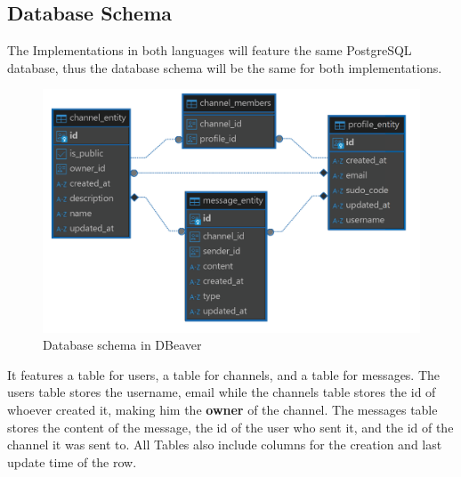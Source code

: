 \documentclass[a4paper,12pt]{article}
\begin{document}
	\newpage
	\subsection{Database Schema}
	\label{subsec:database_schema}
	The Implementations in both languages will feature the same PostgreSQL database, thus the database schema will 
	be the same for both implementations.
	\begin{figure}[h]
		\centering
		\includegraphics[width=\textwidth]{dbeaver_database_representation.png}
		\caption{Database schema in DBeaver}
		\label{fig:dbeaver_database_representation}
	\end{figure}

	It features a table for users, a table for channels, and a table for messages. The users table stores the username, email
	while the channels table stores the id of whoever created it, making him the \textbf{owner} of the channel. The messages table
	stores the content of the message, the id of the user who sent it, and the id of the channel it was sent to. All Tables also
	include columns for the creation and last update time of the row.
\end{document}
